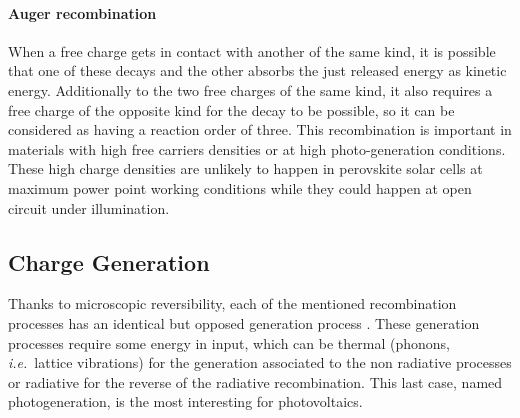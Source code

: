 		\paragraph{Auger recombination}
		When a free charge gets in contact with another of the same kind, it is possible that one of these decays and the other absorbs the just released energy as kinetic energy.
		Additionally to the two free charges of the same kind, it also requires a free charge of the opposite kind for the decay to be possible, so it can be considered as having a reaction order of three.
		This recombination is important in materials with high free carriers densities or at high photo-generation conditions.
		These high charge densities are unlikely to happen in perovskite solar cells at maximum power point working conditions while they could happen at open circuit under illumination.

	\subsection{Charge Generation}
		Thanks to microscopic reversibility, each of the mentioned recombination processes has an identical but opposed generation process \cite[81]{Nelson2003}.
		These generation processes require some energy in input, which can be thermal (phonons, \textsl{i.e.}\ lattice vibrations) for the generation associated to the non radiative processes or radiative for the reverse of the radiative recombination.
		This last case, named photogeneration, is the most interesting for photovoltaics.



